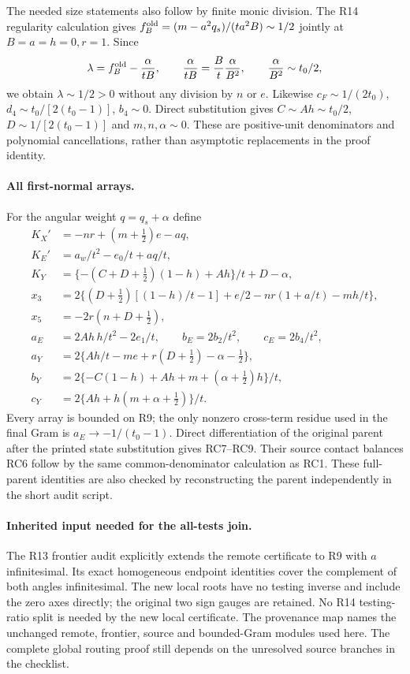 The needed size statements also follow by finite monic division.
The R14 regularity calculation gives
$f_B^{\rm old}=(m-a^2q_s)/(ta^2B)\sim1/2$ jointly at
$B=a=h=0,r=1$. Since
\[
\lambda=f_B^{\rm old}-\frac{\alpha}{tB},\qquad
\frac{\alpha}{tB}=\frac Bt\frac{\alpha}{B^2},\qquad
\frac{\alpha}{B^2}\sim t_0/2,
\]
we obtain $\lambda\sim1/2>0$ without any division by $n$ or $e$.
Likewise $c_F\sim1/(2t_0)$, $d_4\sim t_0/[2(t_0-1)]$,
$b_4\sim0$. Direct substitution gives
$C\sim Ah\sim t_0/2$, $D\sim1/[2(t_0-1)]$ and
$m,n,\alpha\sim0$. These are positive-unit denominators and
polynomial cancellations, rather than asymptotic replacements in
the proof identity.

\paragraph{All first-normal arrays.}
For the angular weight $q=q_s+\alpha$ define
\[
\begin{aligned}
K_X'&=-nr+(m+\tfrac12)e-aq,\\
K_E'&=a_w/t^2-e_0/t+aq/t,\\
K_Y&=\{-(C+D+\tfrac12)(1-h)+Ah\}/t+D-\alpha,\\
x_3&=2\{(D+\tfrac12)[(1-h)/t-1]+e/2-nr(1+a/t)-mh/t\},\\
x_5&=-2r(n+D+\tfrac12),\\
a_E&=2Ah\,h/t^2-2e_1/t,\qquad b_E=2b_2/t^2,\qquad c_E=2b_4/t^2,\\
a_Y&=2\{Ah/t-me+r(D+\tfrac12)-\alpha-\tfrac12\},\\
b_Y&=2\{-C(1-h)+Ah+m+(\alpha+\tfrac12)h\}/t,\\
c_Y&=2\{Ah+h(m+\alpha+\tfrac12)\}/t.
\end{aligned}
\]
Every array is bounded on R9; the only nonzero cross-term residue
used in the final Gram is $a_E\to-1/(t_0-1)$.
Direct differentiation of the original parent after the printed
state substitution gives RC7--RC9. Their source contact balances
RC6 follow by the same common-denominator calculation as RC1.
These full-parent identities are also checked by reconstructing the
parent independently in the short audit script.

\paragraph{Inherited input needed for the all-tests join.}
The R13 frontier audit explicitly extends the remote certificate to
R9 with $a$ infinitesimal. Its exact homogeneous endpoint identities
cover the complement of both angles infinitesimal. The new local
roots have no testing inverse and include the zero axes directly;
the original two sign gauges are retained.
No R14 testing-ratio split is needed by the new local certificate.
The provenance map names the unchanged remote, frontier, source and
bounded-Gram modules used here. The complete global routing proof
still depends on the unresolved source branches in the checklist.
